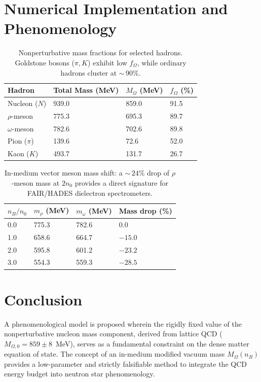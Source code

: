 \documentclass[11pt,a4paper]{article}
\begin{document}
\section{Numerical Implementation and Phenomenology}
\label{sec:numerics}

\begin{table}[h]
\centering
\begin{tabular}{llll}
\toprule
Hadron & Total Mass (MeV) & $M_\Omega$ (MeV) & $f_\Omega$ (\%) \\
\midrule
Nucleon ($N$) & 939.0 & 859.0 & 91.5 \\
$\rho$-meson & 775.3 & 695.3 & 89.7 \\
$\omega$-meson & 782.6 & 702.6 & 89.8 \\
Pion ($\pi$) & 139.6 & 72.6 & 52.0 \\
Kaon ($K$) & 493.7 & 131.7 & 26.7 \\
\bottomrule
\end{tabular}
\caption{Nonperturbative mass fractions for selected hadrons. Goldstone bosons ($\pi, K$) exhibit low $f_\Omega$, while ordinary hadrons cluster at ${\sim}\,90\%$.}
\label{tab:hadrons}
\end{table}

\begin{table}[h]
\centering
\begin{tabular}{llll}
\toprule
$n_B/n_0$ & $m_\rho$ (MeV) & $m_\omega$ (MeV) & Mass drop (\%) \\
\midrule
0.0 & 775.3 & 782.6 & 0.0 \\
1.0 & 658.6 & 664.7 & $-15.0$ \\
2.0 & 595.8 & 601.2 & $-23.2$ \\
3.0 & 554.3 & 559.3 & $-28.5$ \\
\bottomrule
\end{tabular}
\caption{In-medium vector meson mass shift: a ${\sim}\,24\%$ drop of $\rho$-meson mass at $2n_0$ provides a direct signature for FAIR/HADES dielectron spectrometers.}
\label{tab:meson_shift}
\end{table}

\section{Conclusion}
\label{sec:conclusion}

A phenomenological model is proposed wherein the rigidly fixed value of the nonperturbative nucleon mass component, derived from lattice QCD ($M_{\Omega,0} = 859 \pm 8$~MeV), serves as a fundamental constraint on the dense matter equation of state. The concept of an in-medium modified vacuum mass $M_\Omega(n_B)$ provides a low-parameter and strictly falsifiable method to integrate the QCD energy budget into neutron star phenomenology.
\end{document}
